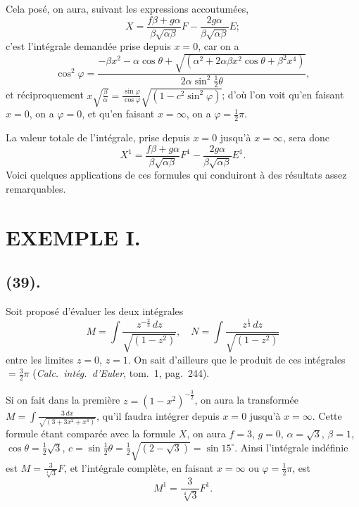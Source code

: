 \documentclass{article}
\begin{document}

Cela posé, on aura, suivant les expressions accoutumées,
\[ X=\frac{f\beta+g\alpha}{\beta\sqrt{\alpha\beta}}F-\frac{2g\alpha}{\beta\sqrt{\alpha\beta}}E; \]
c'est l'intégrale demandée prise depuis $x=0$, car on a
\[ \cos^{2}\varphi=\frac{-\beta x^{2}-\alpha\cos\theta+\sqrt{(\alpha^{2}+2\alpha\beta x^{2}\cos\theta+\beta^{2}x^{4})}}{2\alpha\sin^{2}\tfrac{1}{2}\theta}, \]
et réciproquement $x\sqrt{\frac{\beta}{\alpha}}=\frac{\sin\varphi}{\cos\varphi}\sqrt{(1-c^{2}\sin^{2}\varphi)}$; d'où l'on voit qu'en faisant $x=0$, on a $\varphi=0$, et qu'en faisant $x=\infty$, on a $\varphi=\frac{1}{2}\pi$.

La valeur totale de l'intégrale, prise depuis $x=0$ jusqu'à $x=\infty$, sera donc
\[ X^{1}=\frac{f\beta+g\alpha}{\beta\sqrt{\alpha\beta}}F^{1}-\frac{2g\alpha}{\beta\sqrt{\alpha\beta}}E^{1}. \]
Voici quelques applications de ces formules qui conduiront à des résultats assez remarquables.

\section*{EXEMPLE I.}

\subsection*{(39).}

Soit proposé d'évaluer les deux intégrales
\[ M=\int\frac{z^{-\frac{2}{3}}\,dz}{\sqrt{(1-z^{2})}},\quad N=\int\frac{z^{\frac{1}{3}}\,dz}{\sqrt{(1-z^{2})}} \]
entre les limites $z=0$, $z=1$. On sait d'ailleurs que le produit de ces intégrales $=\frac{3}{2}\pi$ (\emph{Calc.\ intég.\ d'Euler}, tom.~1, pag.~244).

Si on fait dans la première $z=(1-x^{2})^{-\frac{3}{2}}$, on aura la transformée $M=\displaystyle\int\frac{3\,dx}{\sqrt{(3+3x^{2}+x^{4})}}$, qu'il faudra intégrer depuis $x=0$ jusqu'à $x=\infty$. Cette formule étant comparée avec la formule $X$, on aura $f=3$, $g=0$, $\alpha=\sqrt{3}$, $\beta=1$, $\cos\theta=\frac{1}{2}\sqrt{3}$, $c=\sin\frac{1}{2}\theta=\frac{1}{2}\sqrt{(2-\sqrt{3})}=\sin 15^{\circ}$. Ainsi l'intégrale indéfinie est $M=\frac{3}{\sqrt[4]{3}}F$, et l'intégrale complète, en faisant $x=\infty$ ou $\varphi=\frac{1}{2}\pi$, est
\[ M^{1}=\frac{3}{\sqrt[4]{3}}F^{1}. \]

\end{document}
